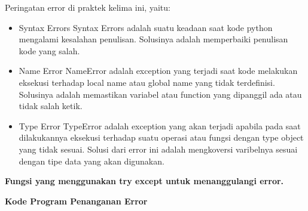 Peringatan error di praktek kelima ini, yaitu:
\begin{itemize}
	\item Syntax Errors
	Syntax Errors adalah suatu keadaan saat kode python mengalami kesalahan penulisan. Solusinya adalah memperbaiki penulisan kode yang salah.

	\item Name Error
	NameError adalah exception yang terjadi saat kode melakukan eksekusi terhadap local name atau global name yang tidak terdefinisi. Solusinya adalah memastikan variabel atau function yang dipanggil ada atau tidak salah ketik.

	\item Type Error
	TypeError adalah exception yang akan terjadi apabila pada saat dilakukannya eksekusi terhadap suatu operasi atau fungsi dengan type object yang tidak sesuai. Solusi dari error ini adalah mengkoversi varibelnya sesuai dengan tipe data yang akan digunakan.
\end{itemize}

\textbf{Fungsi yang menggunakan try except untuk menanggulangi error.}



\textbf{Kode Program Penanganan Error}

